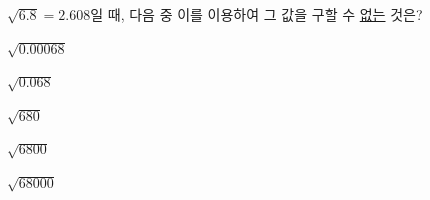 $\sqrt{6.8}=2.608$일 때, 다음 중 이를 이용하여 그 값을 구할 수 \underline{없는} 것은?
\begin{choices32}{\rule[-3ex]{0pt}{8ex}$\sqrt{0.00068}$}{\rule[-3ex]{0pt}{8ex}$\sqrt{0.068}$}{\rule[-3ex]{0pt}{8ex}$\sqrt{680}$}{\rule[-3ex]{0pt}{8ex}$\sqrt{6800}$}{\rule[-3ex]{0pt}{8ex}$\sqrt{68000}$}\end{choices32}

